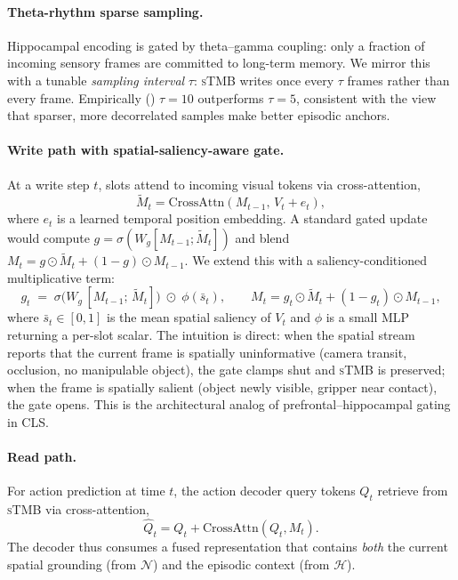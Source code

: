 \documentclass[10pt,letterpaper]{article}
\newcommand{\sTMB}{\textsc{sTMB}\xspace}
\begin{document}
\paragraph{Theta-rhythm sparse sampling.}
Hippocampal encoding is gated by theta--gamma coupling: only a fraction of incoming sensory frames are committed to long-term memory. We mirror this with a tunable \emph{sampling interval} $\tau$: \sTMB writes once every $\tau$ frames rather than every frame. Empirically () $\tau=10$ outperforms $\tau=5$, consistent with the view that sparser, more decorrelated samples make better episodic anchors.

\paragraph{Write path with spatial-saliency-aware gate.}
\label{sec:gate}
At a write step $t$, slots attend to incoming visual tokens via cross-attention,
\begin{equation}
    \tilde M_t = \mathrm{CrossAttn}(M_{t-1},\, V_t + e_t),
\end{equation}
where $e_t$ is a learned temporal position embedding. A standard gated update would compute $g = \sigma(W_g[M_{t-1};\tilde M_t])$ and blend $M_t = g \odot \tilde M_t + (1{-}g)\odot M_{t-1}$. We extend this with a saliency-conditioned multiplicative term:
\begin{equation}
    g_t \;=\; \sigma\!\bigl(W_g\, [M_{t-1};\,\tilde M_t]\bigr) \;\odot\; \phi(\bar s_t),\qquad
    M_t = g_t \odot \tilde M_t + (1 - g_t) \odot M_{t-1},
    \label{eq:gate}
\end{equation}
where $\bar s_t \in [0,1]$ is the mean spatial saliency of $V_t$ and $\phi$ is a small MLP returning a per-slot scalar. The intuition is direct: when the spatial stream reports that the current frame is spatially uninformative (camera transit, occlusion, no manipulable object), the gate clamps shut and \sTMB is preserved; when the frame is spatially salient (object newly visible, gripper near contact), the gate opens. This is the architectural analog of prefrontal--hippocampal gating in CLS.

\paragraph{Read path.}
For action prediction at time $t$, the action decoder query tokens $Q_t$ retrieve from \sTMB via cross-attention,
\begin{equation}
    \hat Q_t = Q_t + \mathrm{CrossAttn}(Q_t, M_t).
\end{equation}
The decoder thus consumes a fused representation that contains \emph{both} the current spatial grounding (from $\mathcal{N}$) and the episodic context (from $\mathcal{H}$).
\end{document}
